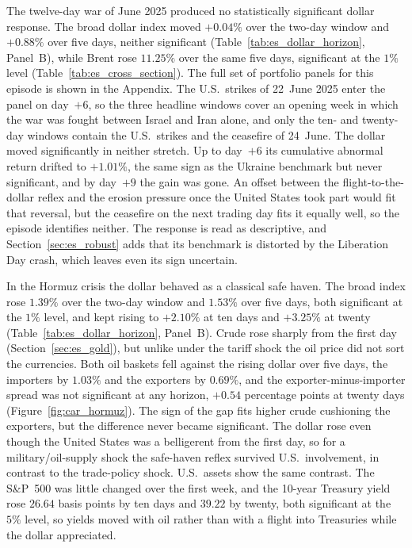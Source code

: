 The twelve-day war of June 2025 produced no statistically significant dollar response. The broad dollar index moved $+0.04\%$ over the two-day window and $+0.88\%$ over five days, neither significant (Table~\ref{tab:es_dollar_horizon}, Panel~B), while Brent rose $11.25\%$ over the same five days, significant at the $1\%$ level (Table~\ref{tab:es_cross_section}). The full set of portfolio panels for this episode is shown in the Appendix. The U.S.\ strikes of 22~June 2025 enter the panel on day~$+6$, so the three headline windows cover an opening week in which the war was fought between Israel and Iran alone, and only the ten- and twenty-day windows contain the U.S.\ strikes and the ceasefire of 24~June. The dollar moved significantly in neither stretch. Up to day~$+6$ its cumulative abnormal return drifted to $+1.01\%$, the same sign as the Ukraine benchmark but never significant, and by day~$+9$ the gain was gone. An offset between the flight-to-the-dollar reflex and the erosion pressure once the United States took part would fit that reversal, but the ceasefire on the next trading day fits it equally well, so the episode identifies neither. The response is read as descriptive, and Section~\ref{sec:es_robust} adds that its benchmark is distorted by the Liberation Day crash, which leaves even its sign uncertain.

In the Hormuz crisis the dollar behaved as a classical safe haven. The broad index rose $1.39\%$ over the two-day window and $1.53\%$ over five days, both significant at the $1\%$ level, and kept rising to $+2.10\%$ at ten days and $+3.25\%$ at twenty (Table~\ref{tab:es_dollar_horizon}, Panel~B). Crude rose sharply from the first day (Section~\ref{sec:es_gold}), but unlike under the tariff shock the oil price did not sort the currencies. Both oil baskets fell against the rising dollar over five days, the importers by $1.03\%$ and the exporters by $0.69\%$, and the exporter-minus-importer spread was not significant at any horizon, $+0.54$ percentage points at twenty days (Figure~\ref{fig:car_hormuz}). The sign of the gap fits higher crude cushioning the exporters, but the difference never became significant. The dollar rose even though the United States was a belligerent from the first day, so for a military/oil-supply shock the safe-haven reflex survived U.S.\ involvement, in contrast to the trade-policy shock. U.S.\ assets show the same contrast. The S\&P~500 was little changed over the first week, and the 10-year Treasury yield rose $26.64$ basis points by ten days and $39.22$ by twenty, both significant at the $5\%$ level, so yields moved with oil rather than with a flight into Treasuries while the dollar appreciated.

